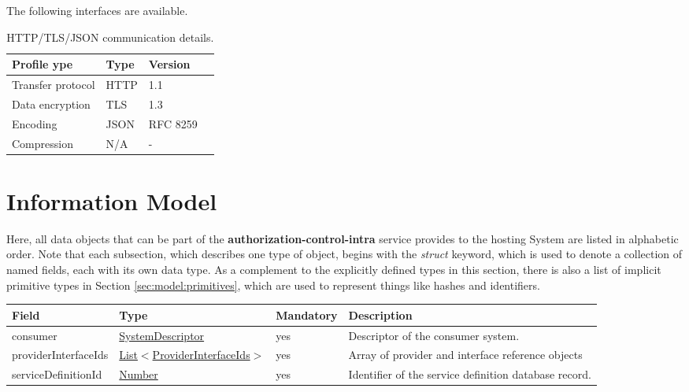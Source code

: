 \documentclass[a4paper]{arrowhead}
\newcommand{\pref}[1]{{\textcolor{ArrowheadGrey}{\hyperref[sec:model:primitives:#1]{#1}}}}
\begin{document}
The following interfaces are available.


\begin{table}[ht!]
  \centering
  \begin{tabular}{|l|l|l|l|}
    \rowcolor{gray!33} Profile ype & Type & Version \\ \hline
    Transfer protocol & HTTP & 1.1 \\ \hline
    Data encryption & TLS & 1.3 \\ \hline
    Encoding & JSON & RFC 8259 \cite{rfc8259} \\ \hline
    Compression & N/A & - \\ \hline
  \end{tabular}
  \caption{HTTP/TLS/JSON communication details.}
  \label{tab:comunication_semantics_profile}
\end{table}

\clearpage

\section{Information Model}
\label{sec:model}

Here, all data objects that can be part of the \textbf{authorization-control-intra} service
provides to the hosting System are listed in alphabetic order.
Note that each subsection, which describes one type of object, begins with the \textit{struct} keyword, which is used to denote a collection of named fields, each with its own data type.
As a complement to the explicitly defined types in this section, there is also a list of implicit primitive types in Section \ref{sec:model:primitives}, which are used to represent things like hashes and identifiers.

\label{sec:model:CheckAuthRuleRequest}
 
\begin{table}[ht!]
\begin{tabularx}{\textwidth}{| p{3cm} | p{6cm} | p{2cm} | X |} \hline
\rowcolor{gray!33} Field & Type & Mandatory & Description \\ \hline
consumer & \hyperref[sec:model:SystemDescriptor]{SystemDescriptor} & yes & Descriptor of the consumer system. \\ \hline
providerInterfaceIds & \pref{List}$<$\hyperref[sec:model:ProviderInterfaceIds]{ProviderInterfaceIds}$>$ & yes & Array of provider and interface reference objects \\ \hline
serviceDefinitionId &\pref{Number} & yes & Identifier of the service definition database record. \\ \hline
\end{tabularx}
\end{table}
\end{document}
